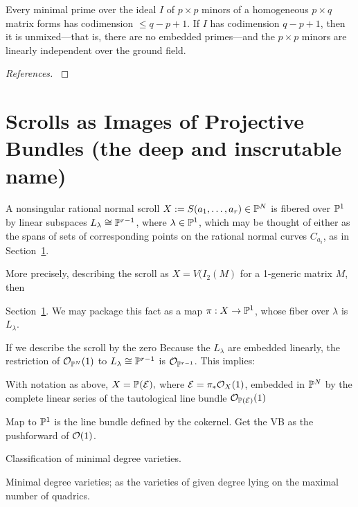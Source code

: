 \begin{fact}\label{Macaulay's Theorem} Every minimal prime over the ideal $I$ of $p\times p$ minors of a homogeneous $p\times q$ matrix forms has codimension $\leq q-p+1$. If $I$ has codimension $q-p+1$, then it is unmixed---that is, there are no embedded primes---and the $p\times p$ minors are linearly independent over the ground field.
\end{fact}

\begin{proof}[References]
\cite[ Theorem *** ]{Ei}
\end{proof}


\section{Scrolls as Images of Projective Bundles (the deep and inscrutable name)}

 
A nonsingular rational normal scroll $X := S(a_{1}, \dots, a_{r})\in \PP^{N}$ is fibered over
$\PP^{1}$ by linear subspaces $L_{\lambda} \cong \PP^{r-1}$, where $\lambda\in \PP^{1}$, which may be thought of either as the spans of sets of corresponding points on the rational normal curves
$C_{a_{i}}$, as in Section~\ref{}.

More precisely, describing the scroll as $X = V(I_{2}(M)$ for a 1-generic matrix $M$, then

 Section~\ref{}. We may package this fact as a map $\pi:X\to \PP^{1}$, whose fiber over $\lambda$ is $L_{\lambda}$.

 If we describe the scroll by the zero Because the $L_{\lambda}$ are embedded linearly, the restriction of $\sO_{\PP^{N}}(1)$ to
$L_{\lambda} \cong \PP^{r-1}$ is $\sO_{\PP^{r-1}}$. This implies:

\begin{theorem}
With notation as above, 
$
X = \PP(\sE),
$
where $\sE =\pi_{*}\sO_{X}(1)$, embedded in $\PP^{N}$ by the complete linear series 
of the tautological line bundle $\sO_{\PP(\sE)}(1)$ 
\end{theorem}

Map to $\PP^1$ is the line bundle defined by the cokernel. Get the VB as the pushforward of $\cO(1)$.


\begin{fact} 
 Classification of minimal degree varieties.
 
 Minimal degree varieties; as the varieties of given degree lying on the maximal number of quadrics.

\end{fact}
 
